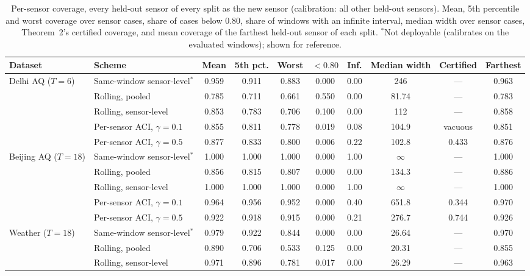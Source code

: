 \begin{table}[htbp]
\caption{Per-sensor coverage, every held-out sensor of every split as the new sensor (calibration: all other held-out sensors). Mean, 5th percentile and worst coverage over sensor cases, share of cases below 0.80, share of windows with an infinite interval, median width over sensor cases, Theorem~2's certified coverage, and mean coverage of the farthest held-out sensor of each split. $^*$Not deployable (calibrates on the evaluated windows); shown for reference.}
\label{tab:d5full}
\centering\scriptsize
\begin{tabular}{llcccccccc}
\toprule
\textbf{Dataset} & \textbf{Scheme} & \textbf{Mean} & \textbf{5th pct.} & \textbf{Worst} & \textbf{$<0.80$} & \textbf{Inf.} & \textbf{Median width} & \textbf{Certified} & \textbf{Farthest} \\
\midrule
Delhi AQ ($T=6$) & Same-window sensor-level$^*$ & 0.959 & 0.911 & 0.883 & 0.000 & 0.00 & 246 & --- & 0.963 \\
 & Rolling, pooled & 0.785 & 0.711 & 0.661 & 0.550 & 0.00 & 81.74 & --- & 0.783 \\
 & Rolling, sensor-level & 0.853 & 0.783 & 0.706 & 0.100 & 0.00 & 112 & --- & 0.858 \\
 & Per-sensor ACI, $\gamma=0.1$ & 0.855 & 0.811 & 0.778 & 0.019 & 0.08 & 104.9 & vacuous & 0.851 \\
 & Per-sensor ACI, $\gamma=0.5$ & 0.877 & 0.833 & 0.800 & 0.006 & 0.22 & 102.8 & 0.433 & 0.876 \\
\midrule
Beijing AQ ($T=18$) & Same-window sensor-level$^*$ & 1.000 & 1.000 & 1.000 & 0.000 & 1.00 & $\infty$ & --- & 1.000 \\
 & Rolling, pooled & 0.856 & 0.815 & 0.807 & 0.000 & 0.00 & 134.3 & --- & 0.886 \\
 & Rolling, sensor-level & 1.000 & 1.000 & 1.000 & 0.000 & 1.00 & $\infty$ & --- & 1.000 \\
 & Per-sensor ACI, $\gamma=0.1$ & 0.964 & 0.956 & 0.952 & 0.000 & 0.40 & 651.8 & 0.344 & 0.970 \\
 & Per-sensor ACI, $\gamma=0.5$ & 0.922 & 0.918 & 0.915 & 0.000 & 0.21 & 276.7 & 0.744 & 0.926 \\
\midrule
Weather ($T=18$) & Same-window sensor-level$^*$ & 0.979 & 0.922 & 0.844 & 0.000 & 0.00 & 26.64 & --- & 0.970 \\
 & Rolling, pooled & 0.890 & 0.706 & 0.533 & 0.125 & 0.00 & 20.31 & --- & 0.855 \\
 & Rolling, sensor-level & 0.971 & 0.896 & 0.781 & 0.017 & 0.00 & 26.29 & --- & 0.963 \\

\end{tabular}
\end{table}
